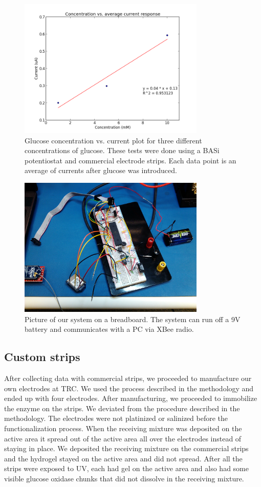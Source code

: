 \begin{figure}[h]
\begin{center}
\includegraphics[width=3.5in]{../figures/CI.png}
\end{center}
\caption{Glucose concentration vs. current plot for three different concentrations of glucose. These tests were done using a BASi potentiostat and commercial electrode strips. Each data point is an average of currents after glucose was introduced.}
\label{fig:ci}
\end{figure}

\begin{figure}[h]
\begin{center}
\includegraphics[width=3.5in]{../figures/board.jpg}
\end{center}
\caption{Picture of our system on a breadboard. The system can run off a 9V battery and communicates with a PC via XBee radio.}
\end{figure}

\subsection{Custom strips}
After collecting data with commercial strips, we proceeded to manufacture our own electrodes at TRC. We used the process described in the methodology and ended up with four electrodes. After manufacturing, we proceeded to immobilize the enzyme on the strips. We deviated from the procedure described in the methodology. The electrodes were not platinized or salinized before the functionalization process. When the receiving mixture was deposited on the active area it spread out of the active area all over the electrodes instead of staying in place. We deposited the receiving mixture on the commercial strips and the hydrogel stayed on the active area and did not spread. After all the strips were exposed to UV, each had gel on the active area and also had some visible glucose oxidase chunks that did not dissolve in the receiving mixture. 


